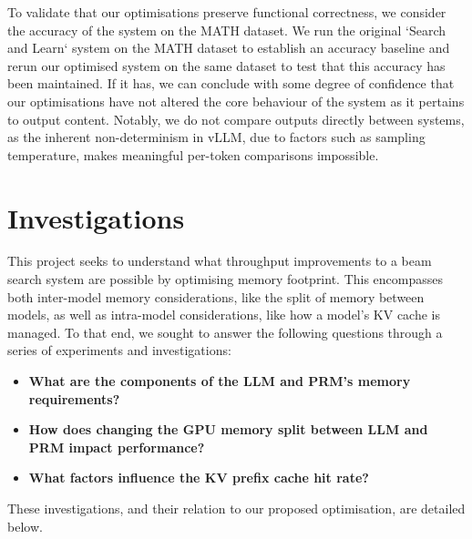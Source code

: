 \documentclass[11pt,twoside]{report}
\begin{document}
To validate that our optimisations preserve functional correctness, we consider the accuracy of the system on the MATH dataset. 
We run the original `Search and Learn` system on the MATH dataset to establish an accuracy baseline and rerun our optimised system on the same dataset to test that this accuracy has been maintained.
If it has, we can conclude with some degree of confidence that our optimisations have not altered the core behaviour of the system as it pertains to output content.
Notably, we do not compare outputs directly between systems, as the inherent non-determinism in vLLM, due to factors such as sampling temperature, makes meaningful per-token comparisons impossible.

\chapter{Investigations}

This project seeks to understand what throughput improvements to a beam search system are possible by optimising memory footprint.
This encompasses both inter-model memory considerations, like the split of memory between models, as well as intra-model considerations, like how a model's KV cache is managed.
To that end, we sought to answer the following questions through a series of experiments and investigations:
\begin{itemize}
    \item \textbf{What are the components of the LLM and PRM's memory requirements?}
    \item \textbf{How does changing the GPU memory split between LLM and PRM impact performance?}
    \item \textbf{What factors influence the KV prefix cache hit rate?}
\end{itemize}
These investigations, and their relation to our proposed optimisation, are detailed below.
\end{document}
